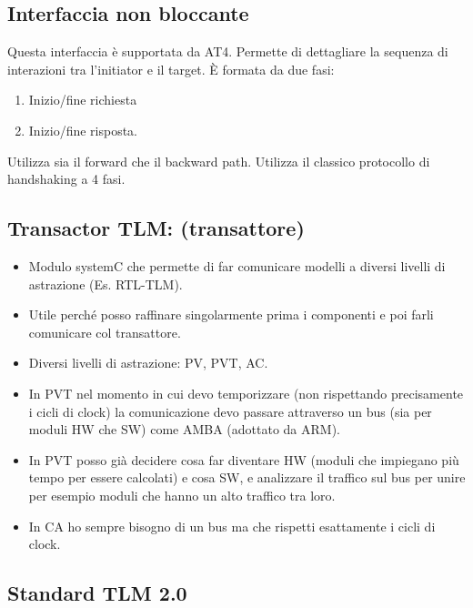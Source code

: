 \documentclass[a4paper]{article}
\theoremstyle{definition}
\begin{document}
	\subsection{Interfaccia non bloccante}
		Questa interfaccia è supportata da AT4. Permette di dettagliare la sequenza di interazioni tra l'initiator e il target. È formata da due fasi:
		\begin{enumerate}
			\item Inizio/fine richiesta
			\item Inizio/fine risposta.
		\end{enumerate}
		Utilizza sia il forward che il backward path. Utilizza il classico protocollo di handshaking a 4 fasi.
			
	\subsection{Transactor TLM: (transattore)}
	
	\begin{itemize}
		\item Modulo systemC che permette di far comunicare modelli a diversi livelli di astrazione (Es. RTL-TLM).
		\item Utile perché posso raffinare singolarmente prima i componenti e poi farli comunicare col transattore.
		\item Diversi livelli di astrazione: PV, PVT, AC.
		\item In PVT nel momento in cui devo temporizzare (non rispettando precisamente i cicli di clock) la comunicazione devo passare attraverso un bus (sia per moduli HW che SW) come AMBA (adottato da ARM).
		\item In PVT posso già decidere cosa far diventare HW (moduli che impiegano più tempo per essere calcolati) e cosa SW, e analizzare il traffico sul bus per unire per esempio moduli che hanno un alto traffico tra loro. 
		\item In CA ho sempre bisogno di un bus ma che rispetti esattamente i cicli di clock.
	\end{itemize}
	
	
	\subsection{Standard TLM 2.0}
	
\end{document}
